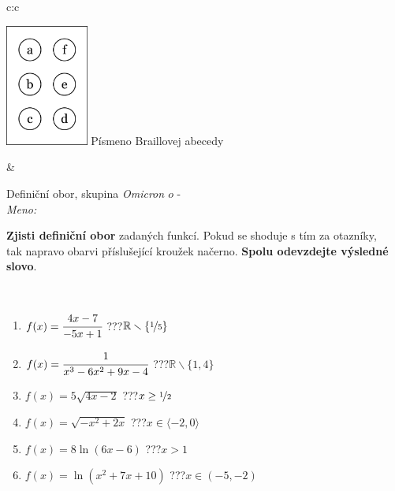 \documentclass[10pt]{report}
\newcommand\omicron{o}
\begin{document}
\begin{tabular}{c:c}
\begin{minipage}[c][104.5mm][t]{0.5\linewidth}
\begin{center}
\begin{minipage}{0.20\linewidth}
\begin{center}
\includegraphics[height=40mm]{../images/braille.png}
{\small Písmeno Braillovej abecedy}
\end{center}
\end{minipage}
\end{center}
\end{minipage}
&
\begin{minipage}[c][104.5mm][t]{0.5\linewidth}
\begin{center}
\vspace{7mm}
{\huge Definiční obor, skupina \textit{Omicron $\omicron$} -}\\[5mm]
\textit{Meno:}\phantom{xxxxxxxxxxxxxxxxxxxxxxxxxxxxxxxxxxxxxxxxxxxxxxxxxxxxxxxxxxxxxxxxx}\\[5mm]
\begin{minipage}{0.95\linewidth}
\textbf{Zjisti definiční obor} zadaných funkcí. Pokud se shoduje s tím za otazníky,\\tak napravo obarvi příslušející kroužek načerno. \textbf{Spolu odevzdejte výsledné slovo}.
\end{minipage}
\\[1mm]
\begin{minipage}{0.79\linewidth}
\begin{center}
\begin{varwidth}{\linewidth}
\begin{enumerate}
\normalsizerrr
\item $f(x)=\cfrac{4x-7}{-5x+1}$\quad \dotfill\; ???\;\dotfill \quad $\mathbb{R}\smallsetminus\{\nicefrac{1}{5}\}$
\item $f(x)=\cfrac{1}{x^3-6x^2+9x-4}$\quad \dotfill\; ???\;\dotfill \quad $\mathbb{R}\smallsetminus\{1,4\}$
\item $f(x)=5\sqrt{4x-2}$\quad \dotfill\; ???\;\dotfill \quad $x\geq\nicefrac{1}{2}$
\item $f(x)=\sqrt{-x^2+2x}$\quad \dotfill\; ???\;\dotfill \quad $x\in\langle-2 , 0\rangle$
\item $f(x)=8\ln{(6x-6)}$\quad \dotfill\; ???\;\dotfill \quad $x>1$
\item $f(x)=\ln{(x^2+7x+10)}$\quad \dotfill\; ???\;\dotfill \quad $x\in(-5 , -2)$

\end{enumerate}
\end{varwidth}
\end{center}
\end{minipage}
\end{center}
\end{minipage}
\end{tabular}
\end{document}

